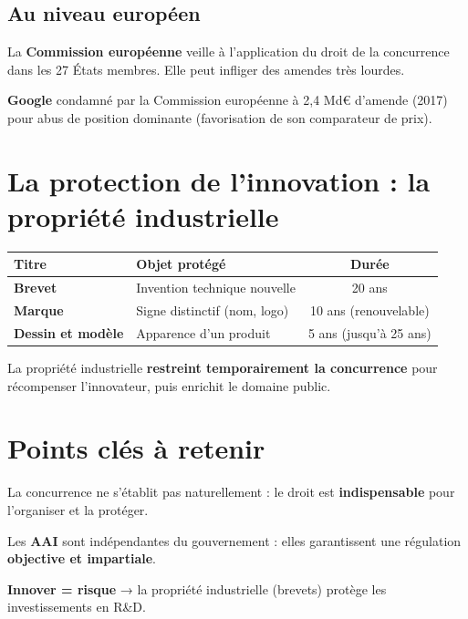 \documentclass[11pt,a4paper]{article}
\begin{document}
\subsection*{Au niveau européen}
\begin{keybox}
La \textbf{Commission européenne} veille à l'application du droit de la concurrence dans les 27 États membres. Elle peut infliger des amendes très lourdes.
\end{keybox}

\begin{exbox}
\textbf{Google} condamné par la Commission européenne à 2,4 Md€ d'amende (2017) pour abus de position dominante (favorisation de son comparateur de prix).
\end{exbox}

\section*{La protection de l'innovation : la propriété industrielle}

\begin{center}
\begin{tabular}{|l|l|c|}
\hline
\textbf{Titre} & \textbf{Objet protégé} & \textbf{Durée} \\
\hline
\textbf{Brevet} & Invention technique nouvelle & 20 ans \\
\textbf{Marque} & Signe distinctif (nom, logo) & 10 ans (renouvelable) \\
\textbf{Dessin et modèle} & Apparence d'un produit & 5 ans (jusqu'à 25 ans) \\
\hline
\end{tabular}
\end{center}

\begin{keybox}
La propriété industrielle \textbf{restreint temporairement la concurrence} pour récompenser l'innovateur, puis enrichit le domaine public.
\end{keybox}

\section*{Points clés à retenir}

\begin{keybox}
La concurrence ne s'établit pas naturellement : le droit est \textbf{indispensable} pour l'organiser et la protéger.
\end{keybox}
\vspace{3pt}
\begin{keybox}
Les \textbf{AAI} sont indépendantes du gouvernement : elles garantissent une régulation \textbf{objective et impartiale}.
\end{keybox}
\vspace{3pt}
\begin{keybox}
\textbf{Innover = risque} → la propriété industrielle (brevets) protège les investissements en R\&D.
\end{keybox}
\end{document}
